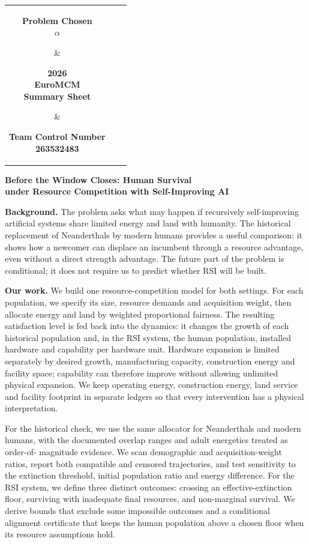 \documentclass[12pt,a4paper]{article}
\theoremstyle{remark}
\newcommand{\TeamNumber}{263532483} %
\newcommand{\PaperTitle}{Before the Window Closes: Human Survival\\under Resource Competition with Self-Improving AI}
\begin{document}
\thispagestyle{fancy}
\vspace*{0pt}
\begin{center}
\begin{tabular}{ccc}
\parbox[t]{0.29\linewidth}{\centering\bfseries Problem Chosen\\[3pt]\Large\textcolor{EuroBlue}{$\alpha$}} &
\parbox[t]{0.29\linewidth}{\centering\bfseries 2026\\EuroMCM\\Summary Sheet} &
\parbox[t]{0.29\linewidth}{\centering\bfseries Team Control Number\\[3pt]\Large\textcolor{EuroBlue}{\TeamNumber}}\\[6pt]
\hline
\end{tabular}
\end{center}
\begin{center}{\large\bfseries \PaperTitle}\end{center}

\textbf{Background.} The problem asks what may happen if recursively
self-improving artificial systems share limited energy and land with humanity.
The historical replacement of Neanderthals by modern humans provides a useful
comparison: it shows how a newcomer can displace an incumbent through a resource
advantage, even without a direct strength advantage. The future part of the problem
is conditional; it does not require us to predict whether RSI will be built.

\textbf{Our work.} We build one resource-competition model for both settings.
For each population, we specify its size, resource demands and acquisition weight,
then allocate energy and land by weighted proportional fairness. The resulting
satisfaction level is fed back into the dynamics: it changes the growth of each
historical population and, in the RSI system, the human population, installed
hardware and capability per hardware unit. Hardware expansion is limited separately
by desired growth, manufacturing capacity, construction energy and facility space;
capability can therefore improve without allowing unlimited physical expansion.
We keep operating energy, construction energy, land service and facility footprint
in separate ledgers so that every intervention has a physical interpretation.

For the historical check, we use the same allocator for Neanderthals and modern
humans, with the documented overlap ranges and adult energetics treated as order-of-
magnitude evidence. We scan demographic and acquisition-weight ratios, report both
compatible and censored trajectories, and test sensitivity to the extinction
threshold, initial population ratio and energy difference. For the RSI system, we
define three distinct outcomes: crossing an effective-extinction floor, surviving
with inadequate final resources, and non-marginal survival. We derive bounds that
exclude some impossible outcomes and a conditional alignment certificate that keeps
the human population above a chosen floor when its resource assumptions hold.
\end{document}
